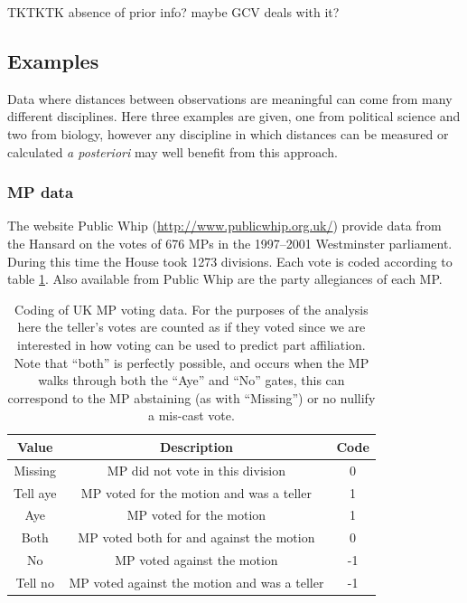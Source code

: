 TKTKTK absence of prior info? maybe GCV deals with it?


\subsection{Examples}

Data where distances between observations are meaningful can come from many different disciplines. Here three examples are given, one from political science and two from biology, however any discipline in which distances can be measured or calculated \textit{a posteriori} may well benefit from this approach.


\subsubsection{MP data}


The website Public Whip (\url{http://www.publicwhip.org.uk/}) provide data from the Hansard on the votes of 676 MPs in the 1997--2001 Westminster parliament. During this time the House took 1273 divisions. Each vote is coded according to table \ref{voting-code}. Also available from Public Whip are the party allegiances of each MP. 

\begin{table}  
\begin{centering}
\begin{tabular}{ccc}
    Value & Description & Code \\ 
    \hline
    Missing & MP did not vote in this division & 0 \\ 
    Tell aye & MP voted for the motion and was a teller & 1 \\ 
    Aye & MP voted for the motion & 1 \\ 
    Both & MP voted both for  and against the motion & 0 \\ 
    No & MP voted against the motion & -1 \\ 
    Tell no & MP voted against the motion and was a teller & -1 \\ 
  \end{tabular}
\caption{Coding of UK MP voting data. For the purposes of the analysis here the teller's votes are counted as if they voted since we are interested in how voting can be used to predict part affiliation. Note that ``both'' is perfectly possible, and occurs when the MP walks through both the ``Aye'' and ``No'' gates, this can correspond to the MP abstaining (as with ``Missing'') or no nullify a mis-cast vote.}
\end{centering}
\label{voting-code}
\end{table}

